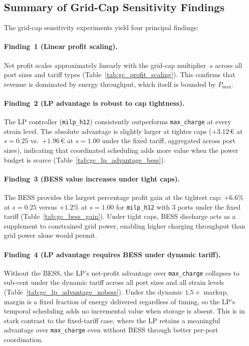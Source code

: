\subsection{Summary of Grid-Cap Sensitivity Findings}
\label{subsec:gc_summary}

The grid-cap sensitivity experiments yield four principal findings:

\paragraph{Finding~1 (Linear profit scaling).}
Net profit scales approximately linearly with the grid-cap multiplier~$s$
across all port sizes and tariff types
(Table~\ref{tab:gc_profit_scaling}).  This confirms that revenue is
dominated by energy throughput, which itself is bounded by $P_{\max}$.

\paragraph{Finding~2 (LP advantage is robust to cap tightness).}
The LP controller (\texttt{milp\_h12}) consistently outperforms
\texttt{max\_charge} at every strain level.  The absolute advantage is
slightly larger at tighter caps ($+3.12$\,€ at $s=0.25$ vs.\ $+1.96$\,€
at $s=1.00$ under the fixed tariff, aggregated across port sizes), indicating
that coordinated scheduling adds more value when the power budget is scarce
(Table~\ref{tab:gc_lp_advantage_bess}).

\paragraph{Finding~3 (BESS value increases under tight caps).}
The BESS provides the largest percentage profit gain at the tightest cap:
$+6.6\%$ at $s=0.25$ versus $+1.2\%$ at $s=1.00$ for \texttt{milp\_h12}
with 3 ports under the fixed tariff (Table~\ref{tab:gc_bess_gain}).  Under
tight caps, BESS discharge acts as a supplement to constrained grid power,
enabling higher charging throughput than grid power alone would permit.

\paragraph{Finding~4 (LP advantage requires BESS under dynamic tariff).}
Without the BESS, the LP's net-profit advantage over \texttt{max\_charge}
collapses to sub-cent under the dynamic tariff across all port sizes and all
strain levels (Table~\ref{tab:gc_lp_advantage_nobess}).  Under the dynamic
$1.5\times$ markup, margin is a fixed fraction of energy delivered regardless
of timing, so the LP's temporal scheduling adds no incremental value when
storage is absent.  This is in stark contrast to the fixed-tariff case, where
the LP retains a meaningful advantage over \texttt{max\_charge} even without
BESS through better per-port coordination.

